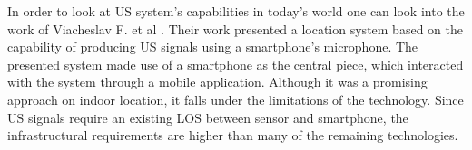\begin{description}
	In order to look at \ac{US} system's capabilities in today's world one can look into the work of Viacheslav F. et al \cite{us_ex}. Their work presented a location system based on the capability of producing \ac{US} signals using a smartphone's microphone. The presented system made use of a smartphone as the central piece, which interacted with the system through a mobile application. Although it was a promising approach on indoor location, it falls under the limitations of the technology. Since \ac{US} signals require an existing \ac{LOS} between sensor and smartphone, the infrastructural requirements are higher than many of the remaining technologies.

\end{description}